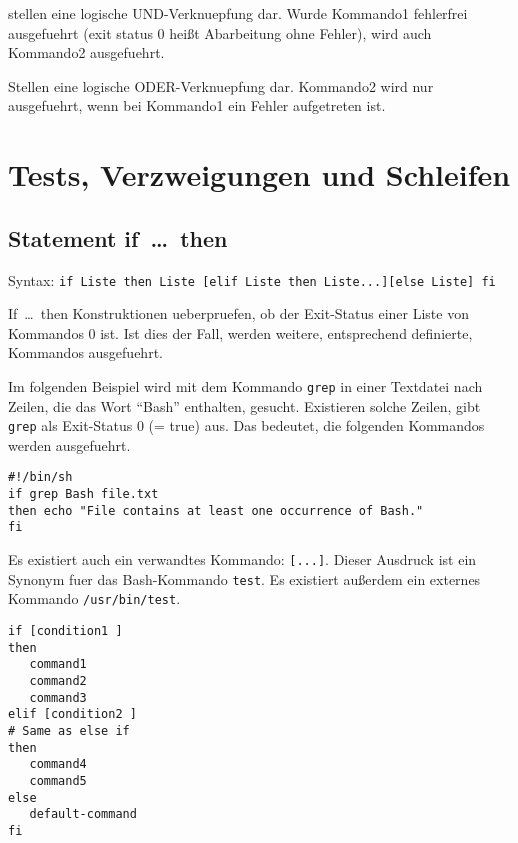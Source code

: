 \documentclass[12pt,]{article}
\providecommand{\tightlist}{%
  \setlength{\itemsep}{0pt}\setlength{\parskip}{0pt}}
\begin{document}
\begin{description}
\tightlist
\item[\textbf{COMMAND1 \&\& COMMAND2}]
stellen eine logische UND-Verknuepfung dar. Wurde Kommando1 fehlerfrei
ausgefuehrt (exit status 0 heißt Abarbeitung ohne Fehler), wird auch
Kommando2 ausgefuehrt.
\item[\textbf{COMMAND1 \textbar{}\textbar{} COMMAND2}]
Stellen eine logische ODER-Verknuepfung dar. Kommando2 wird nur
ausgefuehrt, wenn bei Kommando1 ein Fehler aufgetreten ist.
\end{description}

\section{Tests, Verzweigungen und
Schleifen}\label{tests-verzweigungen-und-schleifen}

\subsection{Statement if~\ldots{}~then}\label{statement-ifthen}

Syntax:
\texttt{if\ Liste\ then\ Liste\ {[}elif\ Liste\ then\ Liste...{]}{[}else\ Liste{]}\ fi}

If~\ldots{}~then Konstruktionen ueberpruefen, ob der Exit-Status einer
Liste von Kommandos 0 ist. Ist dies der Fall, werden weitere,
entsprechend definierte, Kommandos ausgefuehrt.

Im folgenden Beispiel wird mit dem Kommando \texttt{grep} in einer
Textdatei nach Zeilen, die das Wort ``Bash'' enthalten, gesucht.
Existieren solche Zeilen, gibt \texttt{grep} als Exit-Status 0 (= true)
aus. Das bedeutet, die folgenden Kommandos werden ausgefuehrt.

\begin{verbatim}
#!/bin/sh
if grep Bash file.txt
then echo "File contains at least one occurrence of Bash."
fi
\end{verbatim}

Es existiert auch ein verwandtes Kommando: \texttt{{[}...{]}}. Dieser
Ausdruck ist ein Synonym fuer das Bash-Kommando \texttt{test}. Es
existiert außerdem ein externes Kommando \texttt{/usr/bin/test}.

\begin{verbatim}
if [condition1 ]
then
   command1
   command2
   command3
elif [condition2 ]
# Same as else if
then
   command4
   command5
else
   default-command
fi
\end{verbatim}
\end{document}
